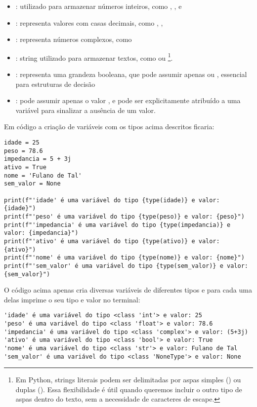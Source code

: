 \begin{itemize}
    \item {}: utilizado para armazenar números inteiros, como , , e 
    \item {}: representa valores com casas decimais, como , , 
    \item {}: representa números complexos, como 
    \item {}: string utilizado para armazenar textos, como  ou
        \footnote{Em Python, strings literais podem ser delimitadas por aspas simples
        (\inlkey{\'}) ou duplas (\inlkey{\"}). Essa flexibilidade é útil quando queremos incluir o outro tipo de aspas dentro do texto, sem a necessidade de caracteres de escape.}.
    \item {}: representa uma grandeza booleana, que pode assumir apenas  ou , essencial para estruturas de decisão
    \item {}: pode assumir apenas o valor , e pode ser explicitamente atribuído
    a uma variável para sinalizar a ausência de um valor.



\end{itemize}

Em código a criação de variáveis com os tipos acima descritos ficaria:
\begin{verbatim}
idade = 25
peso = 78.6
impedancia = 5 + 3j
ativo = True
nome = 'Fulano de Tal'
sem_valor = None

print(f"'idade' é uma variável do tipo {type(idade)} e valor: {idade}")
print(f"'peso' é uma variável do tipo {type(peso)} e valor: {peso}")
print(f"'impedancia' é uma variável do tipo {type(impedancia)} e valor: {impedancia}")
print(f"'ativo' é uma variável do tipo {type(ativo)} e valor: {ativo}")
print(f"'nome' é uma variável do tipo {type(nome)} e valor: {nome}")
print(f"'sem_valor' é uma variável do tipo {type(sem_valor)} e valor: {sem_valor}")
\end{verbatim}

O código acima apenas cria diversas variáveis de diferentes tipos e para cada uma delas imprime o seu tipo e valor no terminal:
\begin{verbatim}
'idade' é uma variável do tipo <class 'int'> e valor: 25
'peso' é uma variável do tipo <class 'float'> e valor: 78.6
'impedancia' é uma variável do tipo <class 'complex'> e valor: (5+3j)
'ativo' é uma variável do tipo <class 'bool'> e valor: True
'nome' é uma variável do tipo <class 'str'> e valor: Fulano de Tal
'sem_valor' é uma variável do tipo <class 'NoneType'> e valor: None
\end{verbatim}

